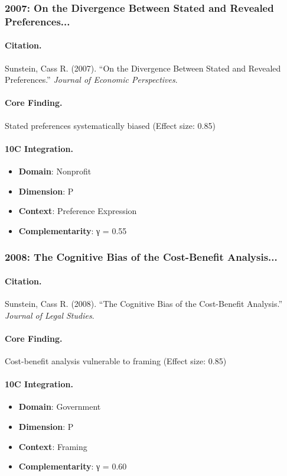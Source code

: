 \subsubsection{2007: On the Divergence Between Stated and Revealed Preferences...}

\paragraph{Citation.}
Sunstein, Cass R. (2007). ``On the Divergence Between Stated and Revealed Preferences.''
\textit{Journal of Economic Perspectives}.

\paragraph{Core Finding.}
Stated preferences systematically biased (Effect size: 0.85)

\paragraph{10C Integration.}
\begin{itemize}[nosep]
  \item \textbf{Domain}: Nonprofit
  \item \textbf{Dimension}: P
  \item \textbf{Context}: Preference Expression
  \item \textbf{Complementarity}: γ = 0.55
\end{itemize}

\subsubsection{2008: The Cognitive Bias of the Cost-Benefit Analysis...}

\paragraph{Citation.}
Sunstein, Cass R. (2008). ``The Cognitive Bias of the Cost-Benefit Analysis.''
\textit{Journal of Legal Studies}.

\paragraph{Core Finding.}
Cost-benefit analysis vulnerable to framing (Effect size: 0.85)

\paragraph{10C Integration.}
\begin{itemize}[nosep]
  \item \textbf{Domain}: Government
  \item \textbf{Dimension}: P
  \item \textbf{Context}: Framing
  \item \textbf{Complementarity}: γ = 0.60
\end{itemize}

